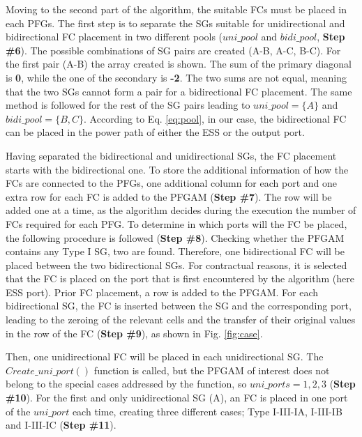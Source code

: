 \documentclass[conference]{IEEEtran}
\begin{document}
Moving to the second part of the algorithm, the suitable FCs must be placed in each PFGs. The first step is to separate the SGs suitable for unidirectional and bidirectional FC placement in two different pools ($uni\_pool$ and $bidi\_pool$, \textbf{Step \#6}). The possible combinations of SG pairs are created (A-B, A-C, B-C). For the first pair (A-B) the array created is shown. The sum of the primary diagonal is \textbf{0}, while the one of the secondary is \textbf{-2}.  The two sums are not equal, meaning that the two SGs  cannot form a pair for a bidirectional FC placement. The same method is followed for the rest of the SG pairs leading to $uni\_pool=\{A\}$ and $bidi\_pool=\{B, C\}$. According to Eq. \ref{eq:pool}, in our case, the bidirectional FC can be placed in the power path of either the ESS or the output port.

Having separated the bidirectional and unidirectional SGs, the FC placement starts with the bidirectional one. To store the additional information of how the FCs are connected to the PFGs, one additional column for each port and one extra row for each FC is added to the PFGAM (\textbf{Step \#7}). The row will be added one at a time, as the algorithm decides during the execution the number of FCs required for each PFG. To determine in which ports will the FC be placed, the following procedure is followed (\textbf{Step \#8}). Checking whether the PFGAM contains any Type I SG, two are found. Therefore, one bidirectional FC will be placed between the two bidirectional SGs. For contractual reasons, it is selected that the FC is placed on the port that is first encountered by the algorithm (here ESS port). Prior FC placement, a row is added to the PFGAM. For each bidirectional SG, the FC is inserted between the SG and the corresponding port, leading to the zeroing of the relevant cells and the transfer of their original values in the row of the FC (\textbf{Step \#9}), as shown in Fig. \ref{fig:case}. 

Then, one unidirectional FC will be placed in each unidirectional SG. The $Create\_uni\_port()$ function is called, but the PFGAM of interest does not belong to the special cases addressed by the function, so $uni\_ports={1, 2, 3}$ (\textbf{Step \#10}). For the first and only unidirectional SG (A), an FC is placed in one port of the $uni\_port$ each time, creating three different cases; Type I-III-IA, I-III-IB and I-III-IC (\textbf{Step \#11}).
\end{document}
